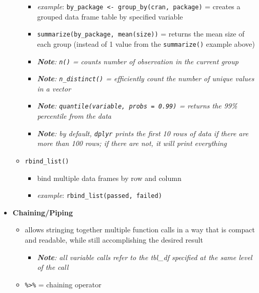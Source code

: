 \documentclass[
]{article}
\providecommand{\tightlist}{%
  \setlength{\itemsep}{0pt}\setlength{\parskip}{0pt}}
\begin{document}
\begin{itemize}
\begin{itemize}
    \begin{itemize}
    \tightlist
    \item
      \emph{example}:
      \texttt{by\_package\ \textless{}-\ group\_by(cran,\ package)} =
      creates a grouped data frame table by specified variable
    \item
      \texttt{summarize(by\_package,\ mean(size))} = returns the mean
      size of each group (instead of 1 value from the
      \texttt{summarize()} example above)
    \item
      \emph{\textbf{Note}: \texttt{n()} = counts number of observation
      in the current group }
    \item
      \emph{\textbf{Note}: \texttt{n\_distinct()} = efficiently count
      the number of unique values in a vector }
    \item
      \emph{\textbf{Note}: \texttt{quantile(variable,\ probs\ =\ 0.99)}
      = returns the 99\% percentile from the data }
    \item
      \emph{\textbf{Note}: by default, \texttt{dplyr} prints the first
      10 rows of data if there are more than 100 rows; if there are not,
      it will print everything }
    \end{itemize}
  \item
    \texttt{rbind\_list()}

    \begin{itemize}
    \tightlist
    \item
      bind multiple data frames by row and column
    \item
      \emph{example}: \texttt{rbind\_list(passed,\ failed)}
    \end{itemize}
  \end{itemize}
\item
  \textbf{Chaining/Piping}

  \begin{itemize}
  \tightlist
  \item
    allows stringing together multiple function calls in a way that is
    compact and readable, while still accomplishing the desired result

    \begin{itemize}
    \tightlist
    \item
      \emph{\textbf{Note}: all variable calls refer to the tbl\_df
      specified at the same level of the call }
    \end{itemize}
  \item
    \texttt{\%\textgreater{}\%} = chaining operator


\end{itemize}
\end{itemize}
\end{document}
